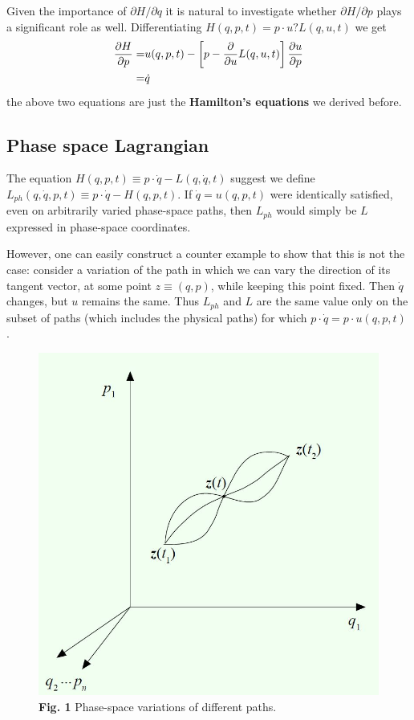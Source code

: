 \documentclass[letterpaper,10pt,english]{sphinxmanual}
\begin{document}
Given the importance of \(\partial H/ \partial q\) it is natural to investigate whether \(\partial H/\partial p\) plays a significant role as well. Differentiating \(H(q, p, t)= p\cdot u ? L(q,u, t)\) we get
\begin{gather}
\begin{split}\frac{\partial H}{\partial p}=&u(q,p,t)-\left[p-\frac{\partial}{\partial u}L(q,u,t)\right]\frac{\partial u}{\partial p} \\
=&\dot{q}\end{split}\notag
\end{gather}
the above two equations are just the \textbf{Hamilton's equations} we derived before.


\subsection{Phase space Lagrangian}
\label{CM/Lagrangian:id4}
The equation \(H(q,p,t)\equiv p\cdot\dot{q}-L(q,\dot{q},t)\) suggest we define \(L_{ph}(q,\dot{q},p,t)\equiv p\cdot\dot{q}-H(q,p,t)\). If \(\dot{q}=u(q,p,t)\) were identically satisfied, even on arbitrarily varied phase-space paths, then \(L_{ph}\) would simply be \(L\) expressed in phase-space coordinates.

However, one can easily construct a counter example to show that this is not the case: consider a variation of the path in which we can vary the direction of its tangent vector, at some point \(z\equiv (q, p)\), while keeping this
point fixed. Then \(\dot{q}\) changes, but \(u\) remains the same. Thus \(L_{ph}\) and \(L\) are the same value only on the subset of paths (which includes the physical paths) for which \(p\cdot\dot{q} = p\cdot u(q, p, t)\) .
\begin{figure}[htbp]
\centering
\capstart

\includegraphics[width=0.500\linewidth]{1.jpg}
\caption{\textbf{Fig. 1} Phase-space variations of different paths.}\end{figure}
\end{document}
